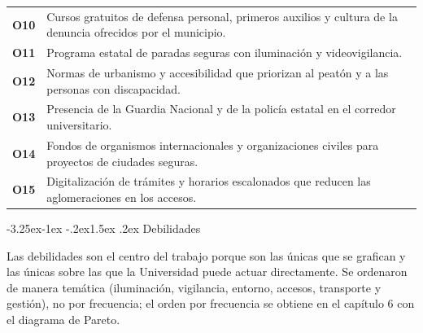 \documentclass[11pt,a4paper]{article}
\makeatletter
\renewcommand\subsection{\@startsection{subsection}{2}{\z@}%
  {-3.25ex\@plus -1ex \@minus -.2ex}{1.5ex \@plus .2ex}%
  {\normalfont\large\bfseries\color{uazblue!85!black}}}
\newcommand{\clave}[1]{\textbf{\color{uazblue}#1}}
\makeatother
\begin{document}
{\begin{longtable}{@{}L{1.25cm}L{13.9cm}@{}}
\clave{O10} & Cursos gratuitos de defensa personal, primeros auxilios y cultura de la denuncia ofrecidos por el municipio. \\
\clave{O11} & Programa estatal de paradas seguras con iluminación y videovigilancia. \\
\clave{O12} & Normas de urbanismo y accesibilidad que priorizan al peatón y a las personas con discapacidad. \\
\clave{O13} & Presencia de la Guardia Nacional y de la policía estatal en el corredor universitario. \\
\clave{O14} & Fondos de organismos internacionales y organizaciones civiles para proyectos de ciudades seguras. \\
\clave{O15} & Digitalización de trámites y horarios escalonados que reducen las aglomeraciones en los accesos. \\
\end{longtable}}

\subsection{Debilidades}

Las debilidades son el centro del trabajo porque son las únicas que se grafican
y las únicas sobre las que la Universidad puede actuar directamente. Se
ordenaron de manera temática (iluminación, vigilancia, entorno, accesos,
transporte y gestión), no por frecuencia; el orden por frecuencia se obtiene en
el capítulo 6 con el diagrama de Pareto.
\end{document}
